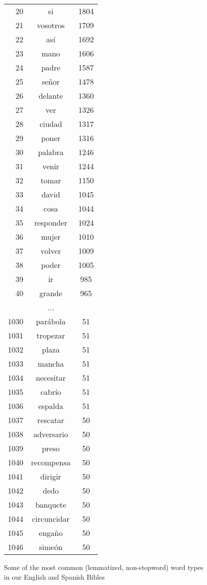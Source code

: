 \begin{figure*}
\begin{tiny}
\begin{centering}
\begin{tabular}{|r|c|c|}
20 & si & 1804 \\
21 & vosotros & 1709 \\
22 & así & 1692 \\
23 & mano & 1606 \\
24 & padre & 1587 \\
25 & señor & 1478 \\
26 & delante & 1360 \\
27 & ver & 1326 \\
28 & ciudad & 1317 \\
29 & poner & 1316 \\
30 & palabra & 1246 \\
31 & venir & 1244 \\
32 & tomar & 1150 \\
33 & david & 1045 \\
34 & cosa & 1044 \\
35 & responder & 1024 \\
36 & mujer & 1010 \\
37 & volver & 1009 \\
38 & poder & 1005 \\
39 & ir & 985 \\
40 & grande & 965 \\
    \multicolumn{3}{|c|}{...} \\ 
1030 & parábola & 51 \\
1031 & tropezar & 51 \\
1032 & plaza & 51 \\
1033 & mancha & 51 \\
1034 & necesitar & 51 \\
1035 & cabrío & 51 \\
1036 & espalda & 51 \\
1037 & rescatar & 50 \\
1038 & adversario & 50 \\
1039 & preso & 50 \\
1040 & recompensa & 50 \\
1041 & dirigir & 50 \\
1042 & dedo & 50 \\
1043 & banquete & 50 \\
1044 & circuncidar & 50 \\
1045 & engaño & 50 \\
1046 & simeón & 50 \\
    \hline

  \end{tabular}
  \end{centering}
  \end{tiny}
  \caption{Some of the most common (lemmatized, non-stopword) word types in our
  English and Spanish Bibles}
  \label{fig:mostcommon-en-es}
\end{figure*}

